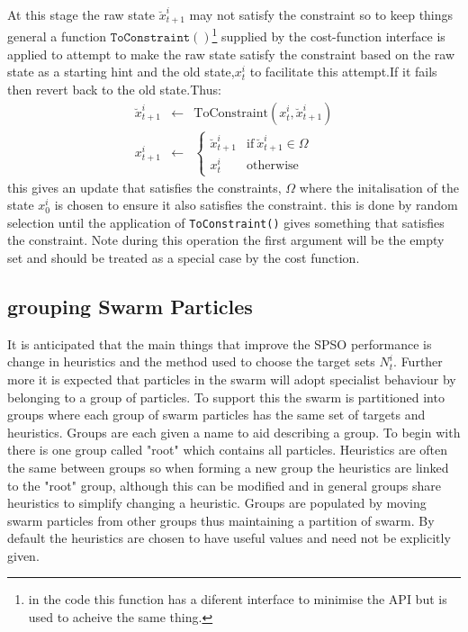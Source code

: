 \documentclass[a4paper,oneside,english]{book}
\numberwithin{equation}{section}
\numberwithin{figure}{section}
\begin{document}
At this stage the raw state $\breve{x}_{t+1}^i$ may not satisfy the constraint so to keep things general a function $\mathtt{ToConstraint()}$\footnote{in the code this function has a diferent interface to minimise the API but is used to acheive the same thing.} supplied by the cost-function interface is applied  to attempt to make the raw state  satisfy the constraint based on the raw state as a starting hint and the old state,$x_t^i$ to facilitate this attempt.If it fails then revert back to the old state.Thus: 
\begin{align}
\breve{x}_{t+1}^i&\leftarrow&\mathrm{ToConstraint}(x_t^i,\breve{x}_{t+1}^i)\\
x_{t+1}^i &\leftarrow& \left\lbrace
\begin{array}{cc}
\breve{x}_{t+1}^i& \mathrm{if}\: \breve{x}_{t+1}^i \in \Omega\\
x_t^i&\mathrm{otherwise}
\end{array}\right.
\end{align} 
this gives an update that satisfies the constraints, $\Omega$ where  the initalisation of the state $x_0^i$ is chosen to ensure it also satisfies the constraint. this is done by random selection until the application of  \texttt{ToConstraint()} gives something that satisfies the constraint. Note during this operation the first argument will be the empty set and should be treated as a special case by the cost function.

\subsection{grouping Swarm Particles } 
It is anticipated  that the main things that improve the SPSO performance is change in heuristics and the method used to choose the target sets $N_t^i$. Further more it is expected that particles in the swarm will adopt specialist behaviour by belonging to a group of particles. To support this the swarm is  partitioned into groups where each group of swarm particles has the same set of targets and heuristics. Groups are each given a name to aid describing a group. To begin with there is one group called "root" which contains all particles. Heuristics are often the same between groups so when forming a new group the heuristics are linked to the "root" group, although this can be modified and in general groups share heuristics to simplify changing a heuristic. Groups are populated by moving swarm particles from other groups thus maintaining a partition of swarm. By default the heuristics are chosen to have useful values and need not be explicitly given.              
\end{document}
